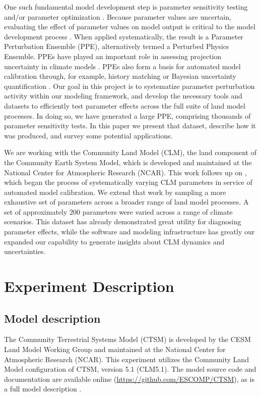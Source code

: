 \documentclass[draft]{agujournal2019}
\begin{document}
One such fundamental model development step is parameter sensitivity testing and/or parameter optimization \cite{qian2018}.
Because parameter values are uncertain, evaluating the effect of parameter values on model output is critical to the model development process \cite{hourdin2017,balaji2022}.
When applied systematically, the result is a Parameter Perturbation Ensemble (PPE), alternatively termed a Perturbed Physics Ensemble.
PPEs have played an important role in assessing projection uncertainty in climate models \cite{murphy_2004,sanderson2008,booth2012,hawkins2019,yamazaki2021,peatier2022,tett2022}.
PPEs also form a basis for automated model calibration through, for example, history matching \cite{williamson2013,williamson2017,hourdin2020,couvreux2021} or Bayesian uncertainty quantification \cite{cleary2021}.
Our goal in this project is to systematize parameter perturbation activity within our modeling framework, and develop the necessary tools and datasets to efficiently test parameter effects across the full suite of land model processes. 
In doing so, we have generated a large PPE, comprising thousands of parameter sensitivity tests.
In this paper we present that dataset, describe how it was produced, and survey some potential applications.

We are working with the Community Land Model (CLM), the land component of the Community Earth System Model, which is developed and maintained at the National Center for Atmospheric Research (NCAR).
This work follows up on , which began the process of systematically varying CLM parameters in service of automated model calibration.
We extend that work by sampling a more exhaustive set of parameters across a broader range of land model processes.
A set of approximately 200 parameters were varied across a range of climate scenarios.
This dataset has already demonstrated great utility for diagnosing parameter effects, while the software and modeling infrastructure has greatly our expanded our capability to generate insights about CLM dynamics and uncertainties.

\section{Experiment Description}
\label{methods}
\subsection{Model description}
\label{sect:md}
The Community Terrestrial Systems Model (CTSM) is developed by the CESM Land Model Working Group and maintained at the National Center for Atmospheric Research (NCAR). This experiment utilizes the Community Land Model configuration of CTSM, version 5.1 (CLM5.1). The model source code and documentation are available online (\url{https://github.com/ESCOMP/CTSM}), as is a full model description \cite{lawrence2019}.
\end{document}
